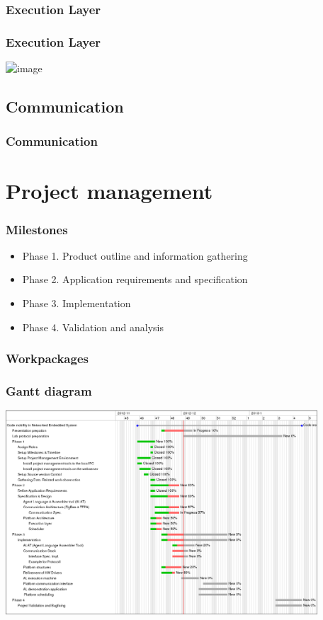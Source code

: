\documentclass{beamer}
\theoremstyle{definition} \newtheorem{mdefinition}{Definition}
\theoremstyle{plain} \newtheorem{mtheorem}{Theorem}
\theoremstyle{plain} \newtheorem{mcorollary}{Corollary}
\theoremstyle{plain} \newtheorem{mfact}{Fact}
\begin{document}
\subsubsection{Execution Layer}
\begin{frame}
	\frametitle{Execution Layer}
\begin{center}
\includegraphics<1>[scale=0.2]{img/plat3} 
\end{center}


\end{frame}


\subsection{Communication}
\begin{frame}
	\frametitle{Communication}

\end{frame}

\section{Project management}
\begin{frame}
	\frametitle{Milestones}
	\begin{itemize}
	\item Phase 1. Product outline and information gathering 
	\item Phase 2. Application requirements and specification
	\item Phase 3. Implementation
	\item Phase 4. Validation and analysis
	\end{itemize}

\end{frame}

\begin{frame}
	\frametitle{Workpackages}
\end{frame}


\begin{frame}
	\frametitle{Gantt diagram}

\begin{center}
\includegraphics[height=3.0in]{img/gantt}

\end{center}
\end{frame}
\end{document}
